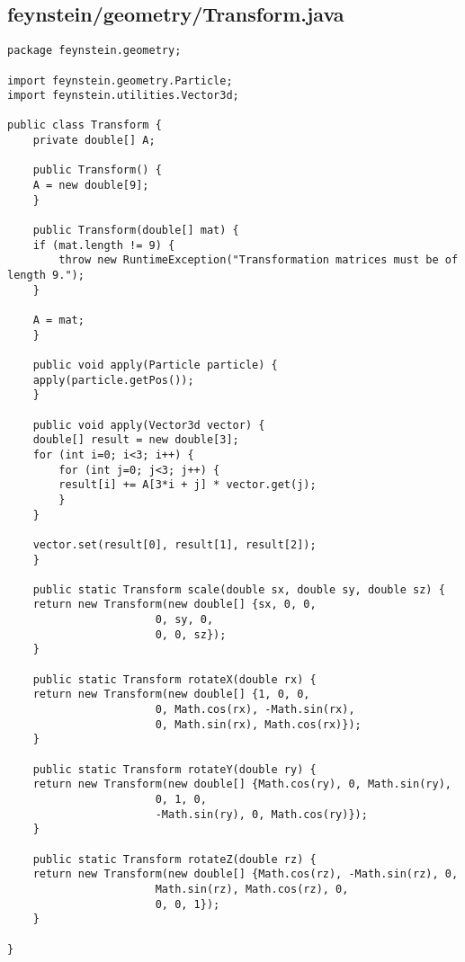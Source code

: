\subsection*{feynstein/geometry/Transform.java}
\begin{lstlisting}
package feynstein.geometry;

import feynstein.geometry.Particle;
import feynstein.utilities.Vector3d;

public class Transform {
    private double[] A;

    public Transform() {
	A = new double[9];
    }

    public Transform(double[] mat) {
	if (mat.length != 9) {
	    throw new RuntimeException("Transformation matrices must be of length 9.");
	}

	A = mat;
    }

    public void apply(Particle particle) {
	apply(particle.getPos());
    }

    public void apply(Vector3d vector) {
	double[] result = new double[3];
	for (int i=0; i<3; i++) {
	    for (int j=0; j<3; j++) {
		result[i] += A[3*i + j] * vector.get(j);
	    }
	}
	
	vector.set(result[0], result[1], result[2]);
    }

    public static Transform scale(double sx, double sy, double sz) {
	return new Transform(new double[] {sx, 0, 0, 
					   0, sy, 0, 
					   0, 0, sz});
    }

    public static Transform rotateX(double rx) {
	return new Transform(new double[] {1, 0, 0,
					   0, Math.cos(rx), -Math.sin(rx),
					   0, Math.sin(rx), Math.cos(rx)});
    }

    public static Transform rotateY(double ry) {
	return new Transform(new double[] {Math.cos(ry), 0, Math.sin(ry),
					   0, 1, 0,
					   -Math.sin(ry), 0, Math.cos(ry)});
    }

    public static Transform rotateZ(double rz) {
	return new Transform(new double[] {Math.cos(rz), -Math.sin(rz), 0,
					   Math.sin(rz), Math.cos(rz), 0,
					   0, 0, 1});
    }

}\end{lstlisting}

